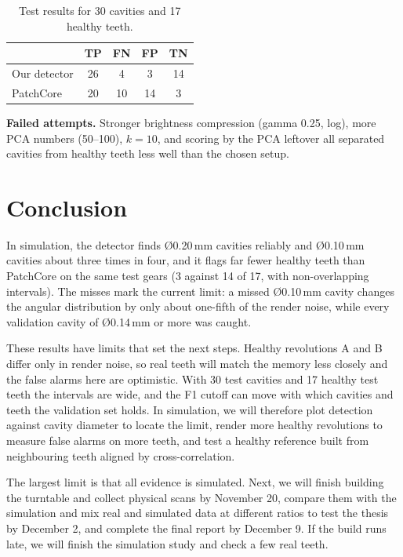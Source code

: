 \documentclass{article}
\begin{document}
\begin{table}[H]
  \centering
  \caption{Test results for 30 cavities and 17 healthy teeth.}
  \label{tab:results}
  \small
  \begin{tabular}{lcccc}
    \toprule
    & TP & FN & FP & TN \\
    \midrule
    Our detector & 26 & 4 & 3 & 14 \\
    PatchCore & 20 & 10 & 14 & 3 \\
    \bottomrule
  \end{tabular}
\end{table}

\textbf{Failed attempts.} Stronger brightness compression (gamma 0.25, log), more PCA numbers (50--100), $k=10$, and scoring by the PCA leftover all separated cavities from healthy teeth less well than the chosen setup.

\section{Conclusion}

In simulation, the detector finds Ø0.20\,mm cavities reliably and Ø0.10\,mm cavities about three times in four, and it flags far fewer healthy teeth than PatchCore on the same test gears (3 against 14 of 17, with non-overlapping intervals). The misses mark the current limit: a missed Ø0.10\,mm cavity changes the angular distribution by only about one-fifth of the render noise, while every validation cavity of Ø0.14\,mm or more was caught.

These results have limits that set the next steps. Healthy revolutions A and B differ only in render noise, so real teeth will match the memory less closely and the false alarms here are optimistic. With 30 test cavities and 17 healthy test teeth the intervals are wide, and the F1 cutoff can move with which cavities and teeth the validation set holds. In simulation, we will therefore plot detection against cavity diameter to locate the limit, render more healthy revolutions to measure false alarms on more teeth, and test a healthy reference built from neighbouring teeth aligned by cross-correlation.

The largest limit is that all evidence is simulated. Next, we will finish building the turntable and collect physical scans by November 20, compare them with the simulation and mix real and simulated data at different ratios to test the thesis by December 2, and complete the final report by December 9. If the build runs late, we will finish the simulation study and check a few real teeth.
\end{document}
